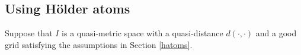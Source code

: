 \documentclass{amsart}
\newtheorem{corollary}[theorem]{Corollary}
\theoremstyle{definition}
\begin{document}


 
 
 
 
 
 
 
 
 
 
 
 \subsection{Using H\"older atoms} \label{hatoms2} Suppose that $I$ is a quasi-metric space with a quasi-distance $d(\cdot,\cdot)$ and a good grid satisfying the assumptions in Section \ref{hatoms}. 
\end{document}
